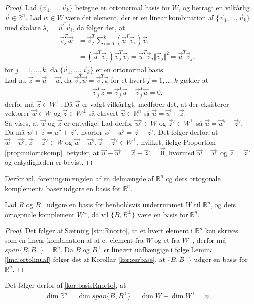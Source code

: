 \begin{proof}
Lad $\{\vec{v}_1,...,\vec{v}_k\}$ betegne en ortonormal basis for $W$, og betragt en vilkårlig $\vec{u} \in \mathds{R}^n$. 
Lad $w \in W$ være det element, der er en linear kombination af $\{\vec{v}_1,...,\vec{v}_k\}$ med skalare $\lambda_i = \vec{u}^T\vec{v}_i$, da følger det, at
\begin{align*}
\vec{v}_j^T\vec{w} &= \vec{v}_j^T\sum_{i=0}^k(\vec{u}^T\vec{v}_i)\vec{v}_i
\\ & = (\vec{u}^T\vec{v}_j)\vec{v}_j^T\vec{v}_j = \vec{u}^T\vec{v}_j \Vert \vec{v}_j \Vert^2 = \vec{u}^T\vec{v}_j,
\end{align*}
for $j=1,...,k$, da $\{\vec{v}_1,...,\vec{v}_k\}$ er en ortonormal basis.
\\ Lad nu $\vec{z} = \vec{u}- \vec{w}$, da $\vec{v}_j^T\vec{w}= \vec{v}_j^T\vec{u}$ for et hvert $j=1,...,k$ gælder at 
\begin{align*}
\vec{v}_j^T\vec{z} = \vec{v}_j^T\vec{u}- \vec{v}_j^T\vec{w} = 0,
\end{align*}
derfor må $\vec{z} \in W^{\bot}$. 
Då $\vec{u}$ er valgt vilkårligt, medfører det, at der eksisterer vektorer $\vec{w} \in W$ og $\vec{z} \in W^{\bot}$ så ethvert $\vec{u} \in \mathds{R}^n$ så $\vec{u}= \vec{w}+\vec{z}$.
\\Så vises, at $\vec{w}$ og $\vec{z}$ er entydige.
Lad derfor $\vec{w}' \in W$ og $\vec{z}' \in W^{\bot}$ så $\vec{u}= \vec{w}' + \vec{z}'$.
Da må $\vec{w} + \vec{z} = \vec{w}' + \vec{z}'$, hvorfor $\vec{w}-\vec{w}' = \vec{z}-\vec{z}'$.
Det følger derfor, at $\vec{w}-\vec{w}', \vec{z}-\vec{z}' \in W$ og $\vec{w}-\vec{w}', \vec{z}-\vec{z}' \in W^{\bot}$, hvilket, ifølge Proportion \ref{prop:nulortokomp}, betyder, at $\vec{w}-\vec{w}' = \vec{z}-\vec{z}' = \vec{0}$, hvormed $\vec{w}= \vec{w}'$ og $\vec{z}=\vec{z}'$ og entydigheden er bevist.
\end{proof}
Derfor vil, foreningsmængden af en delmængde af $\mathds{R}^n$ og dets ortogonale komplements baser udgøre en basis for $\mathds{R}^n$.
\begin{kor}
Lad $B$  og $B^{\bot}$ udgøre en basis for henholdsvis underrummet $W$ til $\mathds{R}^n$, og dets ortogonale komplement $W^{\bot}$, da vil $\{B, B^{\bot}\}$ være en basis for $\mathds{R}^n$.
\label{kor:basisRnorto}
\end{kor}
\begin{proof}
Det følger af Sætning \ref{stn:Rnorto}, at et hvert element i $\mathds{R}^n$ kan skrives som en linear kombination af af et element fra $W$ og et fra $W^{\bot}$, derfor må $span\{B, B^{\bot}\} = \mathds{R}^n$. 
Da $B$ og $B^{\bot}$ er lineært uafhængige i følge Lemma \ref{lma:ortolinuaf} følger det af Korollar \ref{kor:serbase}, at $\{B, B^{\bot}\}$ udgør en basis for $\mathds{R}^n$.
\end{proof}
\begin{bem}
Det følger derfor af \ref{kor:basisRnorto}, at
\begin{align}
\dim{\mathds{R}^n} = \dim{span\{B, B^{\bot}\}} = \dim{W} + \dim{W^{\bot}} = n.
\end{align}
\end{bem}
 